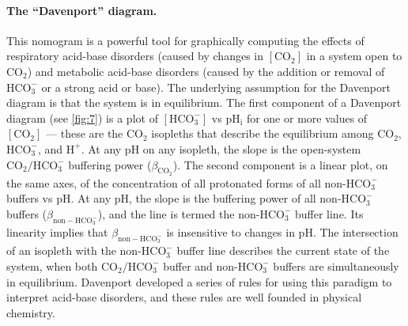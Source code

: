 \documentclass[fleqn,10pt]{physiome}
\begin{document}
\paragraph{The ``Davenport'' diagram.} 
This nomogram \citep{boron2016medical} is a powerful tool for graphically computing the effects of respiratory acid-base disorders (caused by changes in $\mathrm{[CO_2]}$ in a system open to $\mathrm{CO_2}$) and metabolic acid-base disorders (caused by the addition or removal of $\mathrm{HCO_3^-}$ or a strong acid or base). The underlying assumption for the Davenport diagram is that the system is in equilibrium. The first component of a Davenport diagram (see \autoref{fig:7}) is a plot of $\mathrm{[HCO_3^-]}$ vs $\mathrm{pH_i}$ for one or more values of $\mathrm{[CO_2]}$ --- these are the $\mathrm{CO_2}$ isopleths that describe the equilibrium among $\mathrm{CO_2}$, $\mathrm{HCO_3^-}$, and $\mathrm{H^+}$. At any $\mathrm{pH}$ on any isopleth, the slope is the open-system $\mathrm{CO_2}/\mathrm{HCO_3^-}$ buffering power ($\beta_\mathrm{CO_2}$). The second component is a linear plot, on the same axes, of the concentration of all protonated forms of all non-$\mathrm{HCO_3^-}$ buffers vs $\mathrm{pH}$. At any $\mathrm{pH}$, the slope is the buffering power of all non-$\mathrm{HCO_3^-}$ buffers ($\beta_\mathrm{non-HCO_3^-}$), and the line is termed the non-$\mathrm{HCO_3^-}$ buffer line. Its linearity implies that $\beta_\mathrm{non-HCO_3^-}$ is insensitive to changes in $\mathrm{pH}$. The intersection of an isopleth with the non-$\mathrm{HCO_3^-}$ buffer line describes the current state of the system, when both $\mathrm{CO_2}/\mathrm{HCO_3^-}$ buffer and non-$\mathrm{HCO_3^-}$ buffers are simultaneously in equilibrium. Davenport developed a series of rules for using this paradigm to interpret acid-base disorders, and these rules are well founded in physical chemistry.
\end{document}
